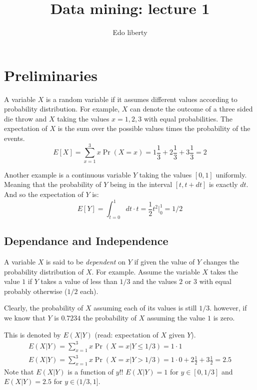 \documentclass{article}
\title{Data mining: lecture 1} %
\author{Edo liberty}
\date{\nonumber}
\begin{document}
\maketitle

\section{Preliminaries}
A variable $X$ is a random variable if it assumes different values
according to probability distribution. For example, $X$ can 
denote the outcome of a three sided die throw and $X$ taking the values $x
= 1,2,3$ with equal probabilities. The
expectation of $X$ is the sum over the possible values times the
probability of the events.
\begin{equation}
E[X] = \sum_{x=1}^{3}x \Pr(X = x)=
1\frac{1}{3}+2\frac{1}{3}+3\frac{1}{3} = 2
\end{equation}

Another example is a continuous variable $Y$ taking the values
$[0,1]$ uniformly. Meaning that the probability of $Y$ being in the
interval $[t,t + dt]$ is exactly $dt$. And so the expectation of $Y$
is:
\begin{equation}
E[Y] = \int_{t=0}^{1}dt \cdot t = \frac{1}{2}t^2|_{0}^{1} = 1/2
\end{equation}


\subsection{Dependance and Independence}
A variable $X$ is said to be {\it dependent} on $Y$ if given the
value of $Y$ changes the probability distribution of $X$. For
example. Assume the variable $X$ takes the value $1$ if $Y$ takes a
value of less than $1/3$ and the values $2$ or $3$ with equal
probably otherwise ($1/2$ each).

Clearly, the probability of $X$ assuming each of its values is still
$1/3$. however, if we know that $Y$ is $0.7234$ the probability of
$X$ assuming the value $1$ is zero.

This is denoted by $E(X | Y)$ (read: expectation of $X$ given $Y$).
\begin{eqnarray}
E(X | Y) = \sum_{x=1}^{3} x \Pr(X = x | Y \le 1/3) = 1\cdot 1\\
E(X | Y) = \sum_{x=1}^{3} x \Pr(X = x | Y > 1/3) = 1\cdot 0 + 2
\frac{1}{2} + 3\frac{1}{2}  = 2.5
\end{eqnarray}
Note that $E(X | Y)$ is a function of $y$!! $E(X | Y) = 1$ for $y
\in [0,1/3]$ and $E(X | Y) = 2.5$ for $y \in (1/3,1]$.
\end{document}
